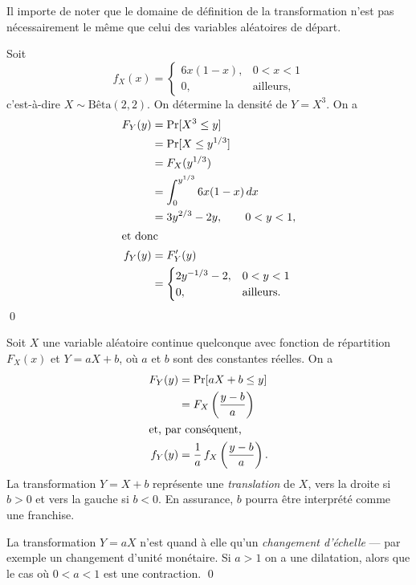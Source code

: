 \begin{rem}
  Il importe de noter que le domaine de définition de la
  transformation n'est pas nécessairement le même que celui des
  variables aléatoires de départ.
\end{rem}

\begin{exemple}
  Soit
  \begin{displaymath}
    f_X(x) =
    \begin{cases}
      6x (1 - x), & 0 < x < 1 \\
      0, & \text{ailleurs},
    \end{cases}
  \end{displaymath}
  c'est-à-dire $X \sim \text{Bêta}(2, 2)$. On détermine la densité de
  $Y = X^3$. On a
  \begin{align*}
    F_Y(y)
    &= \operatorname{Pr} [ X^3 \leq y ] \\
    &= \operatorname{Pr} [ X \leq y^{1/3} ] \\
    &= F_X(y^{1/3}) \\
    &= \int_0^{y^{1/3}} 6x(1 - x)\, dx \\
    &= 3y^{2/3} - 2y, \qquad 0 < y < 1, \\
    \intertext{et donc}
    f_Y(y)
    &= F_Y^\prime(y) \\
    &=
    \begin{cases}
      2y^{-1/3} - 2, & 0 < y < 1 \\
      0, & \text{ailleurs}.
    \end{cases}
  \end{align*}
  \qed
\end{exemple}

\begin{exemple}
  Soit $X$ une variable aléatoire continue quelconque avec fonction de
  répartition $F_X(x)$ et $Y = aX + b$, où $a$ et $b$ sont des
  constantes réelles. On a
  \begin{align*}
    F_Y(y)
    &= \operatorname{Pr} [ a X + b \leq y ] \\
    &= F_X\left( \frac{y - b}{a} \right) \\
    \intertext{et, par conséquent,}
    f_Y(y)
    &= \frac{1}{a}\, f_X\left( \frac{y - b}{a} \right).
  \end{align*}
  La transformation $Y = X + b$ représente une \emph{translation} de
  $X$, vers la droite si $b > 0$ et vers la gauche si $b < 0$. En
  assurance, $b$ pourra être interprété comme une franchise.

  La transformation $Y = aX$ n'est quand à elle qu'un \emph{changement
    d'échelle} --- par exemple un changement d'unité monétaire. Si $a
  > 1$ on a une dilatation, alors que le cas où $0 < a < 1$ est une
  contraction. %
  \qed
\end{exemple}


